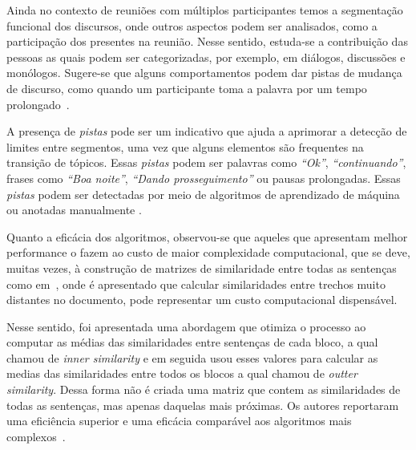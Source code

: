 Ainda no contexto de reuniões com múltiplos participantes temos a segmentação funcional dos discursos, onde outros aspectos podem ser analisados, como a participação dos presentes na reunião. Nesse sentido, estuda-se a contribuição das pessoas as quais podem ser categorizadas,  por exemplo, em diálogos, discussões e monólogos. Sugere-se que alguns comportamentos podem dar pistas de mudança de discurso, como quando um participante toma a palavra por um tempo prolongado~\cite{Bokaei2015}. 



A presença de \textit{pistas} pode ser um indicativo que ajuda a aprimorar a detecção de limites entre segmentos,
uma vez que alguns elementos são frequentes na transição de tópicos. Essas \textit{pistas} podem ser palavras como \textit{``Ok''}, \textit{``continuando''}, frases como \textit{``Boa noite''}, \textit{``Dando prosseguimento''} ou pausas prolongadas. Essas \textit{pistas} podem ser detectadas por meio de algoritmos de aprendizado de máquina ou anotadas manualmente
\cite{Hsueh2006} %
\cite{Galley2003} 
\cite{Beeferman1999}.



Quanto a eficácia dos algoritmos, observou-se que aqueles que apresentam melhor performance o fazem ao custo de maior complexidade computacional, que se deve, muitas vezes, à construção de matrizes de similaridade entre todas as sentenças como em~\cite{Choi2000}, onde é apresentado que calcular similaridades entre trechos muito distantes no documento, pode representar um custo computacional dispensável. 

Nesse sentido, foi apresentada uma abordagem que otimiza o processo ao computar as médias das similaridades entre sentenças de cada bloco, a qual chamou de \textit{inner similarity} e em seguida usou esses valores para calcular as medias das similaridades entre todos os blocos a qual chamou de \textit{outter similarity}. Dessa forma não é criada uma matriz que contem as similaridades de todas as sentenças, mas apenas daquelas mais próximas. Os autores reportaram uma eficiência superior e uma eficácia comparável aos algoritmos mais complexos~\cite{Kern2009}.


